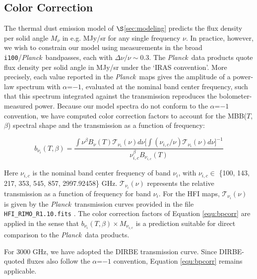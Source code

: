 \documentclass{emulateapj}
\newcommand{\PLANCK}{{\it Planck}}
\begin{document}
\subsection{Color Correction}
\label{sec:bpcorr}
The thermal dust emission model of $\S$\ref{sec:modeling} predicts the 
flux density per solid angle $M_{\nu}$ in e.g. MJy/sr for any single frequency 
$\nu$. In practice, however, we wish to constrain our model using measurements 
in the broad \verb|i100|/\PLANCK~bandpasses, each with $\Delta\nu/\nu\sim0.3$. 
The \PLANCK~data products quote flux density per solid angle in MJy/sr under 
the `IRAS convention'. More precisely, each value reported in the \PLANCK~maps 
gives the amplitude of a power-law spectrum with $\alpha$=$-1$, evaluated at 
the nominal band center frequency, such that this spectrum integrated against 
the transmission reproduces the bolometer-measured power. Because our model 
spectra do not conform to the $\alpha$=$-1$ convention, we have computed color 
correction factors to account for the MBB($T$, $\beta$) spectral shape and the 
transmission as a function of frequency:


\begin{equation} \label{equ:bpcorr}
b_{\nu_i}(T, \beta) = \frac{\int \nu^{\beta}B_{\nu}(T)\mathcal{T}_{\nu_i}(\nu) d\nu \bigg[\int (\nu_{i,c}/\nu)\mathcal{T}_{\nu_i}(\nu) d\nu\bigg]^{-1}}{\nu_{i,c}^{\beta}B_{\nu_{i,c}}(T)}
\end{equation}


Here $\nu_{i,c}$ is the nominal band center frequency of band $\nu_i$,  with 
$\nu_{i,c} \in$ \{100, 143, 217, 353, 545, 857, 2997.92458\} GHz. 
$\mathcal{T}_{\nu_i}(\nu)$ represents the relative transmission as a function 
of frequency for band $\nu_i$. For the HFI maps, $\mathcal{T}_{\nu_i}(\nu)$ is 
given by the \PLANCK~transmission curves provided in the file 
\verb|HFI_RIMO_R1.10.fits| \citep{planckresponse}. The color correction factors
of Equation \ref{equ:bpcorr} are applied in the sense that 
$b_{\nu_i}(T ,\beta)\times M_{\nu_{i,c}}$ is a prediction suitable for 
direct comparison to the \PLANCK~data products.

For 3000 GHz, we have adopted the DIRBE transmission curve. Since DIRBE-quoted
fluxes also follow the $\alpha$=$-1$ convention, Equation \ref{equ:bpcorr}
remains applicable.
\end{document}
